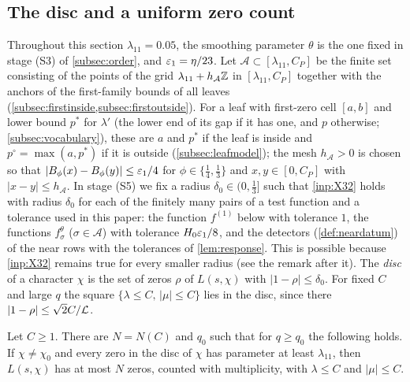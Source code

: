 \subsection{The disc and a uniform zero count}\label{subsec:zerocount}
Throughout this section $\lambda_{11}=0.05$, the smoothing parameter $\theta$ is the one fixed in stage
(S3) of \cref{subsec:order}, and $\varepsilon_1=\eta/23$. Let $\mathcal A\subset[\lambda_{11},C_P]$ be the finite set
consisting of the points of the grid $\lambda_{11}+h_{\mathcal A}\mathbb{Z}$ in $[\lambda_{11},C_P]$ together with the
anchors of the first-family bounds of all leaves (\cref{subsec:firstinside,subsec:firstoutside}). For a leaf
with first-zero cell $[a,b]$ and lower bound $p^*$ for $\lambda'$ (the lower end of its gap if it has
one, and $p$ otherwise; \cref{subsec:vocabulary}), these are $a$ and $p^*$ if the leaf is inside and
$p^\circ=\max(a,p^*)$ if it is outside (\cref{subsec:leafmodel});
the mesh $h_{\mathcal A}>0$ is chosen so that $|B_\phi(x)-B_\phi(y)|\le\varepsilon_1/4$ for $\phi\in\{\frac14,\frac13\}$
and $x,y\in[0,C_P]$ with $|x-y|\le h_{\mathcal A}$. In stage (S5) we fix a radius $\delta_0\in(0,\frac13]$ such
that \cref{inp:X32} holds with radius $\delta_0$ for each of the finitely many pairs of a test
function and a tolerance used in this paper: the function $f^{(1)}$ below with tolerance $1$, the
functions $f^\theta_\sigma$ ($\sigma\in\mathcal A$) with tolerance $H_0\varepsilon_1/8$, and the detectors (\cref{def:neardatum}) of the near
rows with the tolerances of \cref{lem:response}. This is possible because \cref{inp:X32} remains
true for every smaller radius (see the remark after it). The \emph{disc} of a character $\chi$ is the
set of zeros $\rho$ of $L(s,\chi)$ with $|1-\rho|\le\delta_0$. For fixed $C$ and large $q$ the square
$\{\lambda\le C,\,|\mu|\le C\}$ lies in the disc, since there $|1-\rho|\le\sqrt2C/\mathcal{L}$.

\begin{lemma}\label{lem:zerocount}
Let $C\ge1$. There are $N=N(C)$ and $q_0$ such that for $q\ge q_0$ the following holds. If
$\chi\ne\chi_0$ and every zero in the disc of $\chi$ has parameter at least $\lambda_{11}$, then $L(s,\chi)$
has at most $N$ zeros, counted with multiplicity, with $\lambda\le C$ and $|\mu|\le C$.
\end{lemma}


